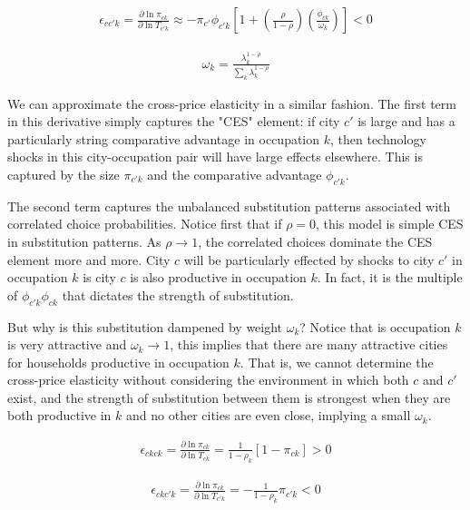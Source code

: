 \documentclass[10pt]{article}
\begin{document}
\begin{align}
    \epsilon_{cc'k} = \frac{\partial \ln \pi_{ck}}{\partial \ln T_{c'k}} \approx - \pi_{c'} \phi_{c'k} \left[ 1 + \left( \frac{\rho}{1 - \rho} \right) \left( \frac{\phi_{ck}}{\omega_k} \right) \right] < 0
    \label{cross_city_elasticity}
\end{align}

\begin{align}
    \omega_k = \frac{\lambda_k^{1 - \rho}}{\sum_{k}^{} \lambda_k^{1 - \rho}}
\end{align}

We can approximate the cross-price elasticity in a similar fashion. The first term in this derivative simply captures the "CES" element: if city $c'$ is large and has a particularly string comparative advantage in occupation $k$, then technology shocks in this city-occupation pair will have large effects elsewhere. This is captured by the size $\pi_{c'k}$ and the comparative advantage $\phi_{c'k}$.

The second term captures the unbalanced substitution patterns associated with correlated choice probabilities. Notice first that if $\rho = 0$, this model is simple CES in substitution patterns. As $\rho \to 1$, the correlated choices dominate the CES element more and more. City $c$ will be particularly effected by shocks to city $c'$ in occupation $k$ is city $c$ is also productive in occupation $k$. In fact, it is the multiple of $\phi_{c'k} \phi_{ck}$ that dictates the strength of substitution.

But why is this substitution dampened by weight $\omega_k$? Notice that is occupation $k$ is very attractive and $\omega_k \to 1$, this implies that there are many attractive cities for households productive in occupation $k$. That is, we cannot determine the cross-price elasticity without considering the environment in which both $c$ and $c'$ exist, and the strength of substitution between them is strongest when they are both productive in $k$ and no other cities are even close, implying a small $\omega_k$.

\begin{align}
    \epsilon_{ckck} = \frac{\partial \ln \pi_{ck}}{\partial \ln T_{ck}} = \frac{1}{1 - \rho_k} \left[ 1 - \pi_{ck} \right] > 0
    \label{within_occuaption_elasticity}
\end{align}

\begin{align}
    \epsilon_{ckc'k} = \frac{\partial \ln \pi_{ck}}{\partial \ln T_{c'k}} = - \frac{1}{1 - \rho_k} \pi_{c'k} < 0
    \label{cross_occuaption_elasticity}
\end{align}
\end{document}
